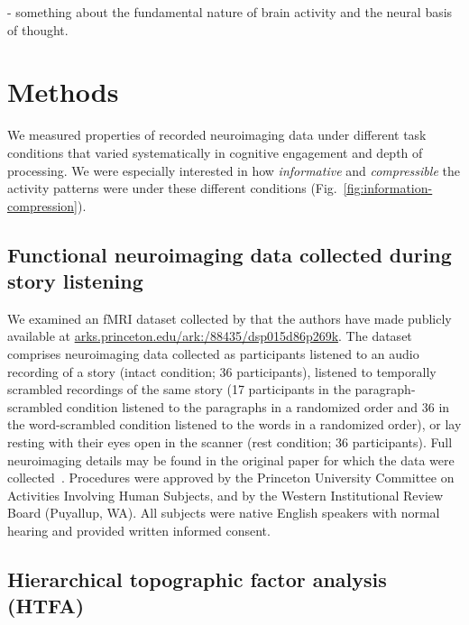 \documentclass[english, 11pt]{article}
\begin{document}
- something about the fundamental nature of brain activity and the neural basis of thought.


\section*{Methods}

We measured properties of recorded neuroimaging data under different task
conditions that varied systematically in cognitive engagement and depth of
processing. We were especially interested in how \textit{informative} and
\textit{compressible} the activity patterns were under these different
conditions (Fig.~\ref{fig:information-compression}).


\subsection*{Functional neuroimaging data collected during story
  listening}

We examined an fMRI dataset collected by \cite{SimoEtal16} that the authors
have made publicly available at
\href{http://arks.princeton.edu/ark:/88435/dsp015d86p269k}{arks.princeton.edu/ark:/88435/dsp015d86p269k}.
The dataset comprises neuroimaging data collected as participants listened to
an audio recording of a story (intact condition; 36 participants), listened to
temporally scrambled recordings of the same story (17 participants in the
paragraph-scrambled condition listened to the paragraphs in a randomized order
and 36 in the word-scrambled condition listened to the words in a randomized
order), or lay resting with their eyes open in the scanner (rest condition; 36
participants). Full neuroimaging details may be found in the original paper for
which the data were collected~\cite{SimoEtal16}. Procedures were approved by
the Princeton University Committee on Activities Involving Human Subjects, and
by the Western Institutional Review Board (Puyallup, WA). All subjects were
native English speakers with normal hearing and provided written informed
consent.

\subsection*{Hierarchical topographic factor analysis (HTFA)}
\end{document}
